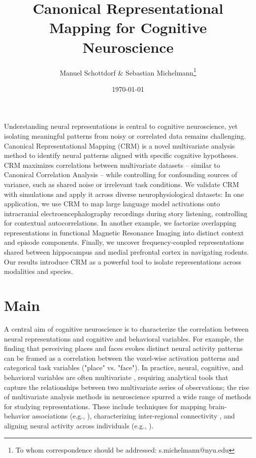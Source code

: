 \documentclass{article}
\title{Canonical Representational Mapping for Cognitive Neuroscience}
\author{Manuel Schottdorf \& Sebastian Michelmann\footnote{To whom correspondence should be addressed: s.michelmann@nyu.edu}}
\date{\today}
\begin{document}
\maketitle

\begin{minipage}{40em}
Understanding neural representations is central to cognitive neuroscience, yet isolating meaningful patterns from noisy or correlated data remains challenging. Canonical Representational Mapping (CRM) is a novel multivariate analysis method to identify neural patterns aligned with specific cognitive hypotheses. CRM maximizes correlations between multivariate datasets -- similar to Canonical Correlation Analysis -- while controlling for confounding sources of variance, such as shared noise or irrelevant task conditions. We validate CRM with simulations and apply it across diverse neurophysiological datasets: In one application, we use CRM to map large language model activations onto intracranial electroencephalography recordings during story listening, controlling for contextual autocorrelations. In another example, we factorize overlapping representations in functional Magnetic Resonance Imaging into distinct context and episode components. Finally, we uncover frequency-coupled representations shared between hippocampus and medial prefrontal cortex in navigating rodents. Our results introduce CRM as a powerful tool to isolate representations across modalities and species.
\end{minipage}

\newpage
\section*{Main}
A central aim of cognitive neuroscience is to characterize the correlation between neural representations and cognitive and behavioral variables. For example, the finding that perceiving places and faces evokes distinct neural activity patterns \cite{haxbyDistributedOverlappingRepresentations2001} can be framed as a correlation between the voxel-wise activation patterns and categorical task variables ("place" vs. "face"). In practice, neural, cognitive, and behavioral variables are often multivariate \cite{normanMindreadingMultivoxelPattern2006, MultivariateBrainbehaviourAssociations}, requiring analytical tools that capture the relationships between two multivariate series of observations; the rise of multivariate analysis methods in neuroscience spurred a wide range of methods for studying representations. These include techniques for mapping brain-behavior associations (e.g., \cite{zadaSharedModelbasedLinguistic2024a, smithPositivenegativeModePopulation2015, dahlDopaminergicNoradrenergicIntegrity2022}), characterizing inter-regional connectivity \cite{youngCouplingMesoscopicBrain2009, fristonFunctionalConnectivityPrincipalComponent1993,koukuntlaUnsupervisedDiscoveryShared2024a}, and aligning neural activity across individuals (e.g., \cite{haxbyCommonHighDimensionalModel2011,niehGeometryAbstractLearned2021a,zhangIntersubjectAlignmentMEG2017}).
\end{document}
